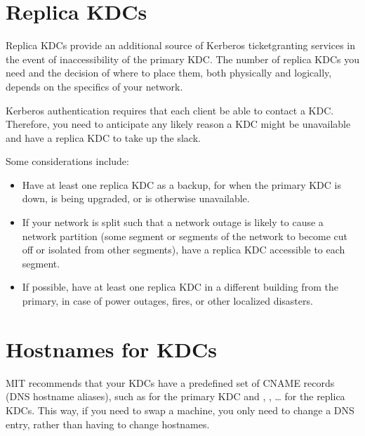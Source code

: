\documentclass[letterpaper,10pt,english]{sphinxmanual}
\begin{document}
\section{Replica KDCs}
\label{\detokenize{admin/realm_config:replica-kdcs}}
\sphinxAtStartPar
Replica KDCs provide an additional source of Kerberos ticket\sphinxhyphen{}granting
services in the event of inaccessibility of the primary KDC.  The
number of replica KDCs you need and the decision of where to place them,
both physically and logically, depends on the specifics of your
network.

\sphinxAtStartPar
Kerberos authentication requires that each client be able to contact a
KDC.  Therefore, you need to anticipate any likely reason a KDC might
be unavailable and have a replica KDC to take up the slack.

\sphinxAtStartPar
Some considerations include:
\begin{itemize}
\item {} 
\sphinxAtStartPar
Have at least one replica KDC as a backup, for when the primary KDC
is down, is being upgraded, or is otherwise unavailable.

\item {} 
\sphinxAtStartPar
If your network is split such that a network outage is likely to
cause a network partition (some segment or segments of the network
to become cut off or isolated from other segments), have a replica
KDC accessible to each segment.

\item {} 
\sphinxAtStartPar
If possible, have at least one replica KDC in a different building
from the primary, in case of power outages, fires, or other
localized disasters.

\end{itemize}


\section{Hostnames for KDCs}
\label{\detokenize{admin/realm_config:hostnames-for-kdcs}}\label{\detokenize{admin/realm_config:kdc-hostnames}}
\sphinxAtStartPar
MIT recommends that your KDCs have a predefined set of CNAME records
(DNS hostname aliases), such as  for the primary KDC and
, , … for the replica KDCs.  This way,
if you need to swap a machine, you only need to change a DNS entry,
rather than having to change hostnames.
\end{document}
